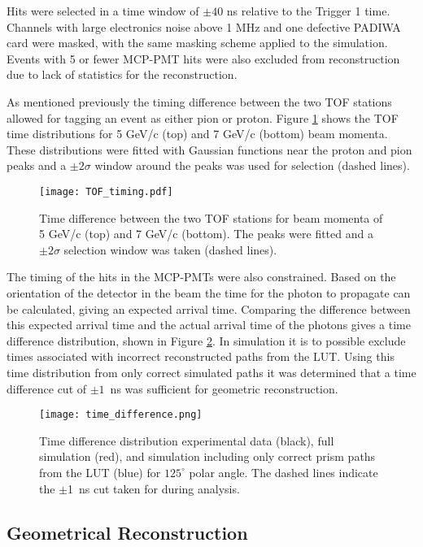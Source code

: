 Hits were selected in a time window of $\pm 40$ ns relative to the Trigger 1 time. Channels with large electronics noise above 1 MHz and one defective PADIWA card were masked, with the same masking scheme applied to the simulation. Events with 5 or fewer MCP-PMT hits were also excluded from reconstruction due to lack of statistics for the reconstruction.

As mentioned previously the timing difference between the two TOF stations allowed for tagging an event as either pion or proton. Figure \ref{fig:tof_timing} shows the TOF time distributions for 5 GeV/c (top) and 7 GeV/c (bottom) beam momenta. These distributions were fitted with Gaussian functions near the proton and pion peaks and a $\pm2\sigma$ window around the peaks was used for selection (dashed lines).

\begin{figure}[!htb]
	\centering
	\texttt{[image: TOF\_timing.pdf]}
	\caption{Time difference between the two TOF stations for beam momenta of 5 GeV/c (top) and 7 GeV/c (bottom). The peaks were fitted and a $\pm2\sigma$ selection window was taken (dashed lines).}
	\label{fig:tof_timing}
\end{figure}

The timing of the hits in the MCP-PMTs were also constrained. Based on the orientation of the detector in the beam the time for the photon to propagate can be calculated, giving an expected arrival time. Comparing the difference between this expected arrival time and the actual arrival time of the photons gives a time difference distribution, shown in Figure \ref{fig:time_difference}. In simulation it is to possible exclude times associated with incorrect reconstructed paths from the LUT. Using this time distribution from only correct simulated paths it was determined that a time difference cut of $\pm1$~ns was sufficient for geometric reconstruction.

\begin{figure}[!htb]
	\centering
	\texttt{[image: time\_difference.png]}
	\caption{Time difference distribution experimental data (black), full simulation (red), and simulation including only correct prism paths from the LUT (blue) for $125^\circ$ polar angle. The dashed lines indicate the $\pm$1~ns cut taken for during analysis.}
	\label{fig:time_difference}
\end{figure}


\subsection{Geometrical Reconstruction}

